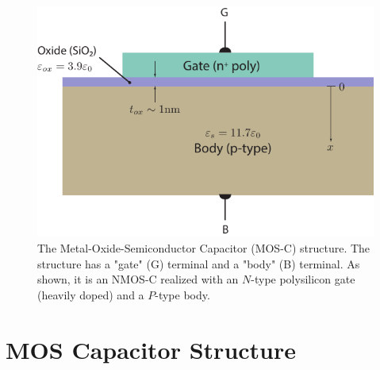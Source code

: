 \begin{figure}[t]
\centering
\includegraphics[width=\columnwidth]{mos_cap_structure}
\caption{The Metal-Oxide-Semiconductor Capacitor  (MOS-C) structure.  The structure has a "gate" (G) terminal and a "body" (B) terminal.  As shown, it is an NMOS-C realized with an $N$-type polysilicon gate (heavily doped) and a $P$-type body.}
\label{fig:mos_cap}
\end{figure}
\section{MOS Capacitor Structure}
